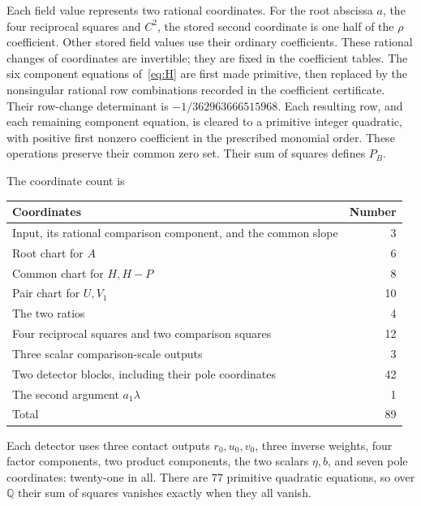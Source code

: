 \documentclass[11pt,a4paper]{article}
\newcommand{\Q}{\mathbb Q}\newcommand{\Z}{\mathbb Z}
\begin{document}
Each field value represents two rational coordinates. For the root abscissa
$a$, the four reciprocal squares and $C^2$, the stored second
coordinate is one half of the $\rho$ coefficient. Other stored field
values use their ordinary coefficients. These rational changes of
coordinates are invertible; they are fixed in the coefficient tables.
The six component equations of~\eqref{eq:H} are first made primitive,
then replaced by the nonsingular rational row combinations recorded in
the coefficient certificate. Their row-change determinant is
$-1/362963666515968$. Each resulting row, and each remaining component
equation, is cleared to a primitive integer quadratic, with positive
first nonzero coefficient in the prescribed monomial order.
These operations preserve their common zero set. Their sum of squares
defines $P_B$.

The coordinate count is
\begin{center}
\begin{tabular}{lr}
\toprule
Coordinates & Number\\\midrule
Input, its rational comparison component, and the common slope &3\\
Root chart for $A$ &6\\
Common chart for $H,H-P$ &8\\
Pair chart for $U,V_1$ &10\\
The two ratios &4\\
Four reciprocal squares and two comparison squares &12\\
Three scalar comparison-scale outputs &3\\
Two detector blocks, including their pole coordinates &42\\
The second argument $a_1\lambda$ &1\\\midrule
Total &89\\\bottomrule
\end{tabular}
\end{center}
Each detector uses three contact outputs $r_0,u_0,v_0$, three inverse
weights, four factor components, two product components, the two scalars
$\eta,b$, and seven pole coordinates: twenty-one in all. There are
$77$ primitive quadratic equations, so over $\Q$ their sum of squares
vanishes exactly when they all vanish.
\end{document}
